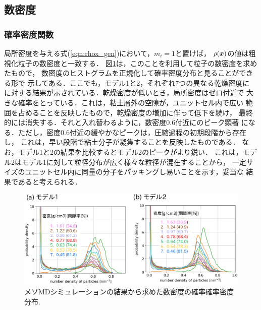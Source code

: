 \subsection{数密度}
\subsubsection{確率密度関数}
局所密度を与える式(\ref{eqn:rhox_gen})において，$m_i=1$と置けば，
$\rho(\mbox{\boldmath $x$})$の値は粗視化粒子の数密度と一致する．
図\ref{fig:fig8}は，このことを利用して粒子の数密度を求めたもので，
数密度のヒストグラムを正規化して確率密度分布と見ることができる形で
示してある．ここでも，モデル1と2，それぞれ7つの異なる乾燥密度に
に対する結果が示されている．乾燥密度が低いとき，局所密度はゼロ付近で
大きな確率をとっている．これは，粘土層外の空隙が，ユニットセル内で広い
範囲を占めることを反映したもので，乾燥密度の増加に伴って低下を続け，
最終的には消失する．それと入れ替わるように，数密度0.6付近にのピーク顕著
になる．ただし，密度0.6付近の緩やかなピークは，圧縮過程の初期段階から存在し，
これは，早い段階で粘土分子が凝集することを反映したものである．
なお，モデル1と2の結果を比較するとモデル2のピークがより鋭い．
これは，モデル2はモデル1に対して粒径分布が広く様々な粒径が混在することから，
一定サイズのユニットセル内に同量の分子をパッキングし易いことを示す，妥当な
結果であると考えられる．
\begin{figure}[h]
	\begin{center}
	\includegraphics[width=1.0\linewidth]{Figs/fig8.eps} 
	\end{center}
	\caption{
		メソMDシミュレーションの結果から求めた数密度の確率確率密度分布.
	} 
	\label{fig:fig8}
\end{figure}
